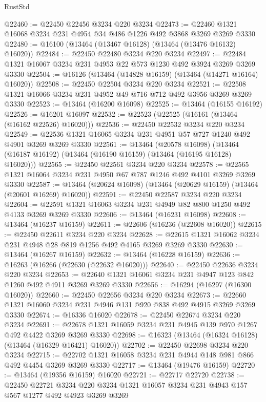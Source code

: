 \begin{lexlean}{RustStd}
\begin{coremodule}
@22460 := @22450 @22456 @3234 @220 @3234
@22473 := @22460 @1321 @16068 @3234 @231 @4954 @34 @486 @1226 @492 @3868 @3269 @3269 @3330
@22480 := @16100 (@13464 (@13467 @16128) (@13464 (@13476 @16132) @16020))
@22484 := @22450 @22480 @3234 @220 @3234
@22497 := @22484 @1321 @16067 @3234 @231 @4953 @22 @573 @1230 @492 @3924 @3269 @3269 @3330
@22504 := @16126 (@13464 (@14828 @16159) (@13464 (@14271 @16164) @16020))
@22508 := @22450 @22504 @3234 @220 @3234
@22521 := @22508 @1321 @16066 @3234 @231 @4952 @49 @716 @712 @492 @3956 @3269 @3269 @3330
@22523 := @13464 (@16200 @16098)
@22525 := @13464 (@16155 @16192)
@22526 := @16201 @16097
@22532 := @22523 (@22525 (@16161 (@13464 (@16162 @22526) @16020)))
@22536 := @22450 @22532 @3234 @220 @3234
@22549 := @22536 @1321 @16065 @3234 @231 @4951 @57 @727 @1240 @492 @4901 @3269 @3269 @3330
@22561 := @13464
    (@20578 @16098)
    (@13464 (@16187 @16192) (@13464 (@16190 @16159) (@13464 (@16195 @16128) @16020)))
@22565 := @22450 @22561 @3234 @220 @3234
@22578 := @22565 @1321 @16064 @3234 @231 @4950 @67 @787 @1246 @492 @4101 @3269 @3269 @3330
@22587 := @13464 (@20624 @16098) (@13464 (@20629 @16159) (@13464 (@20601 @16269) @16020))
@22591 := @22450 @22587 @3234 @220 @3234
@22604 := @22591 @1321 @16063 @3234 @231 @4949 @82 @800 @1250 @492 @4133 @3269 @3269 @3330
@22606 := @13464 (@16231 @16098)
@22608 := @13464 (@16237 @16159)
@22611 := @22606 (@16236 (@22608 @16020))
@22615 := @22450 @22611 @3234 @220 @3234
@22628 := @22615 @1321 @16062 @3234 @231 @4948 @28 @819 @1256 @492 @4165 @3269 @3269 @3330
@22630 := @13464 (@16267 @16159)
@22632 := @13464 (@16228 @16159)
@22636 := @16263 (@16266 (@22630 (@22632 @16020)))
@22640 := @22450 @22636 @3234 @220 @3234
@22653 := @22640 @1321 @16061 @3234 @231 @4947 @123 @842 @1260 @492 @4911 @3269 @3269 @3330
@22656 := @16294 (@16297 (@16300 @16020))
@22660 := @22450 @22656 @3234 @220 @3234
@22673 := @22660 @1321 @16060 @3234 @231 @4946 @131 @920 @838 @492 @4915 @3269 @3269 @3330
@22674 := @16336 @16020
@22678 := @22450 @22674 @3234 @220 @3234
@22691 := @22678 @1321 @16059 @3234 @231 @4945 @139 @970 @1267 @492 @4422 @3269 @3269 @3330
@22698 := @16323 (@13464 (@16324 @16128) (@13464 (@16329 @16421) @16020))
@22702 := @22450 @22698 @3234 @220 @3234
@22715 := @22702 @1321 @16058 @3234 @231 @4944 @148 @981 @866 @492 @4454 @3269 @3269 @3330
@22717 := @13464 (@19476 @16159)
@22720 := @13464 (@19356 @16159) @16020
@22721 := @22717 @22720
@22738 := @22450
    @22721
    @3234
    @220
    @3234
    @1321
    @16057
    @3234
    @231
    @4943
    @157
    @567
    @1277
    @492
    @4923
    @3269
    @3269

\end{coremodule}
\end{lexlean}
